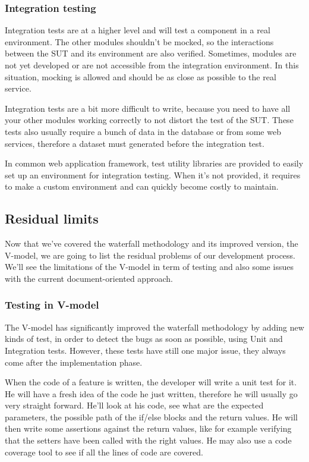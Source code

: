 \subsubsection{Integration testing}
Integration tests are at a higher level and will test a component in a real
environment.
The other modules shouldn't be mocked, so the interactions between the SUT
and its environment are also verified.
Sometimes, modules are not yet developed or are not accessible from the
integration environment.
In this situation, mocking is allowed and should be as close as possible to the
real service.

Integration tests are a bit more difficult to write, because you need to have
all your other modules working correctly to not distort the test of the SUT\@.
These tests also usually require a bunch of data in the database or from some
web services, therefore a dataset must generated before the integration test.

In common web application framework, test utility libraries are provided to
easily set up an environment for integration testing.
When it's not provided, it requires to make a custom environment and can
quickly become costly to maintain.

\subsection{Residual limits}\label{subsec:residual-limits}
Now that we've covered the waterfall methodology and its improved version, the
V-model, we are going to list the residual problems of our development
process.
We'll see the limitations of the V-model in term of testing and also some
issues with the current document-oriented approach.

\subsubsection{Testing in V-model}
The V-model has significantly improved the waterfall methodology by adding
new kinds of test, in order to detect the bugs as soon as possible, using
Unit and Integration tests.
However, these tests have still one major issue, they always come after the
implementation phase.

When the code of a feature is written, the developer will write a unit test
for it.
He will have a fresh idea of the code he just written, therefore he will
usually go very straight forward.
He'll look at his code, see what are the expected parameters, the possible path
of the if/else blocks and the return values.
He will then write some assertions against the return values, like for example
verifying that the setters have been called with the right values.
He may also use a code coverage tool to see if all the lines of code are
covered.

